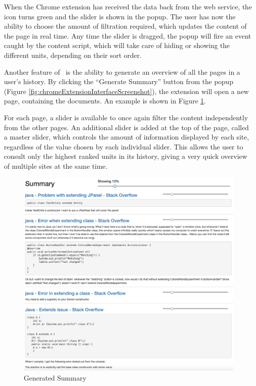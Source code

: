 When the Chrome extension has received the data back from the web service, the icon turns green and the slider is shown in the popup. The user has now the ability to choose the amount of filtration required, which updates the content of the page in real time. Any time the slider is dragged, the popup will fire an event caught by the content script, which will take care of hiding or showing the different units, depending on their sort order.


Another feature of \projectName~is the ability to generate an overview of all the pages in a user's history. By clicking the ``Generate Summary'' button from the popup (Figure \ref{fig:chromeExtensionInterfaceScreenshot}), the extension will open a new page, containing the documents. An example is shown in Figure \ref{fig:chromeExtensionSummaryScreenshot}.

For each page, a slider is available to once again filter the content independently from the other pages. An additional slider is added at the top of the page, called a master slider, which controls the amount of information displayed by each site, regardless of the value chosen by each individual slider. This allows the user to consult only the highest ranked units in its history, giving a very quick overview of multiple sites at the same time.
\begin{figure}[H]
\centering
\includegraphics[scale=0.3]{Figures/SummaryExample}
\caption{Generated Summary}
\label{fig:chromeExtensionSummaryScreenshot}
\end{figure}
